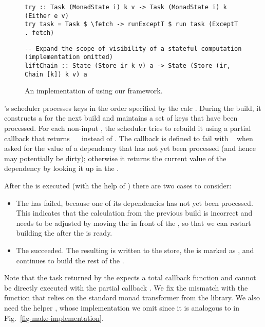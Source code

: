 \begin{figure}
\begin{verbatim}
try :: Task (MonadState i) k v -> Task (MonadState i) k (Either e v)
try task = Task $ \fetch -> runExceptT $ run task (ExceptT . fetch)
\end{verbatim}
\vspace{0mm}
\begin{verbatim}
-- Expand the scope of visibility of a stateful computation (implementation omitted)
liftChain :: State (Store ir k v) a -> State (Store (ir, Chain [k]) k v) a
\end{verbatim}
\vspace{-3mm}
\caption{An implementation of \Excel using our framework.}\label{fig-excel-implementation}
\vspace{-5mm}
\end{figure}

\Excel's  scheduler processes keys in the order specified by the
calc . During the build, it constructs a  for the next
build and maintains a set of keys  that have been processed. For each
non-input , the scheduler tries to rebuild it using a partial 
callback that returns ~~ instead of . The callback
is defined to fail with ~ when asked for the value of a
dependency  that has not yet been processed (and hence may potentially
be dirty); otherwise it returns the current value of the dependency by looking
it up in the .

After the  is executed (with the help of ) there are
two cases to consider:

\begin{itemize}
    \item The  has failed, because one of its dependencies 
    has not yet been processed. This indicates that the calculation 
    from the previous build is incorrect and needs to be adjusted by moving the
     in front of the , so that we can restart building the
     after the  is ready.
    \item The  succeeded. The resulting  is written to
    the store, the  is marked as , and \Excel continues to
    build the rest of the .
\end{itemize}

Note that the task returned by the  expects a total callback
function and cannot be directly executed with the partial callback .
We fix the mismatch with the function  that relies on the standard
monad transformer  from the  library. We also
need the helper , whose implementation we omit since it
is analogous to  in Fig.~\ref{fig-make-implementation}.

